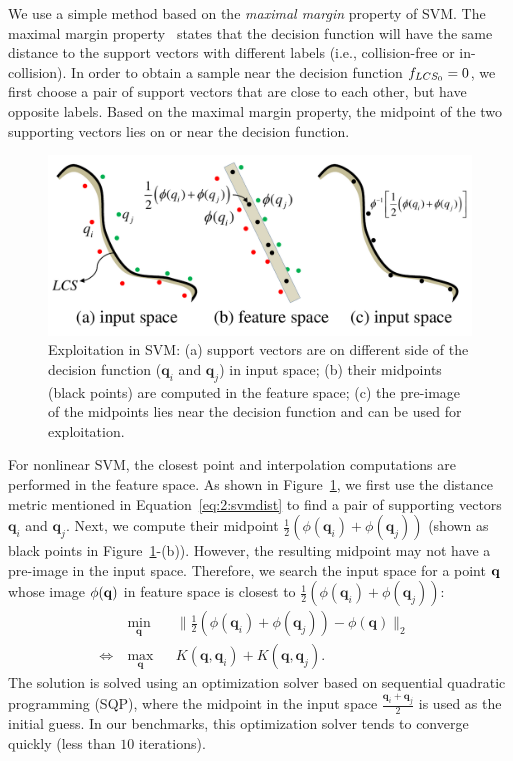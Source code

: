 We use a simple method based on the \emph{maximal margin} property
of SVM. The maximal margin
property~\cite{Vapnik:1995:NSL} states that the decision function
will have the same distance to the support vectors with different
labels (i.e., collision-free or in-collision). In order to obtain a sample near the
decision function $f_{LCS_0} = 0$, we first choose a pair of support
vectors that are close to each other, but have opposite labels.
Based on the maximal margin property, the midpoint of the two
supporting vectors lies on or near the decision function.
\begin{figure}[htb]
  \centering
  \includegraphics[width=0.6\linewidth]{figs/2/interpolation.pdf}
  \caption[Exploitation in SVM]{Exploitation in SVM:
  (a) support vectors are on different side of the decision function ($\mathbf q_i$ and $\mathbf q_j$) in input space;
  (b) their midpoints (black points) are computed in the feature space;
  (c) the pre-image of the midpoints lies near the decision function and can be used for exploitation.}
  \label{fig:2:interpolation}
\end{figure}
For nonlinear SVM, the closest point and interpolation computations are
performed in the feature space. As shown in
Figure~\ref{fig:2:interpolation}, we first use the distance metric
mentioned in Equation~\ref{eq:2:svmdist} to find a pair of
supporting vectors $\mathbf q_i$ and $\mathbf q_j$. Next, we
compute their midpoint $\frac{1}{2}(\phi(\mathbf q_i) +
\phi(\mathbf q_j))$ (shown as black points in Figure~\ref{fig:2:interpolation}-(b)). However, the resulting midpoint may not have
a pre-image in the input space. Therefore, we search the input
space for a point $\mathbf q$ whose image $\phi(\mathbf q)$ in
feature space is closest to $\frac{1}{2}(\phi(\mathbf q_i) +
\phi(\mathbf q_j))$:
\begin{equation}
\begin{aligned}
\label{eq:2:preimage}
& \ \underset{\mathbf q}{\text{min}} & & \|\frac{1}{2}(\phi(\mathbf q_i) + \phi(\mathbf q_j)) - \phi(\mathbf q)\|_2 & \\
\Leftrightarrow & \ \underset{\mathbf q}{\text{max}} & & K(\mathbf q, \mathbf q_i) + K(\mathbf q, \mathbf q_j). &
\end{aligned}
\end{equation}
The solution is solved using an optimization solver based on sequential quadratic programming (SQP), where the midpoint in the input space $\frac{\mathbf q_i +
\mathbf q_j}{2}$ is used as the initial guess. In our
benchmarks, this optimization solver tends to converge quickly
(less than $10$ iterations).


